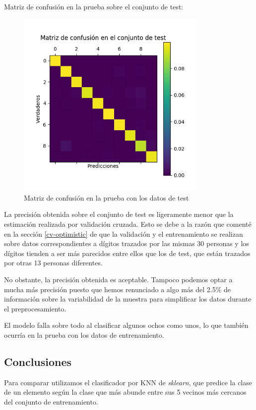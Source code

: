 \documentclass[a4]{article}
\begin{document}
Matriz de confusión en la prueba sobre el conjunto de test:
\vspace{-4mm}
\begin{figure}[H]
  \centering
  \includegraphics[width=92mm]{imgs/conf-test.png}
  \caption{Matriz de confusión en la prueba con los datos de test}
  \label{fig:conf-test}
\end{figure}
\vspace{-4mm}

La precisión obtenida sobre el conjunto de test es ligeramente menor
que la estimación realizada por validación cruzada. Esto se debe a la
razón que comenté en la sección \ref{cv-optimistic} de que la
validación y el entrenamiento se realizan sobre datos correspondientes
a dígitos trazados por las mismas 30 personas y los dígitos tienden a
ser más parecidos entre ellos que los de test, que están trazados por
otras 13 personas diferentes.

No obstante, la precisión obtenida es aceptable. Tampoco podemos
optar a mucha más precisión puesto que hemos renunciado a algo más del
2.5\% de información sobre la variabilidad de la muestra para
simplificar los datos durante el preprocesamiento.

El modelo falla sobre todo al clasificar algunos ochos como unos, lo
que también ocurría en la prueba con los datos de entrenamiento.

\subsection{Conclusiones}

Para comparar utilizamos el clasificador por KNN de
\textit{sklearn}, que predice la clase de un elemento según la clase
que más abunde entre sus 5 vecinos más cercanos del conjunto de
entrenamiento.
\end{document}
